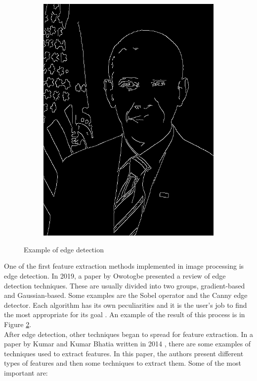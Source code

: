 \documentclass[conference]{IEEEtran}
\begin{document}
\begin{figure}[!ht]
\begin{subfigure}[!ht]{0.48\linewidth}
							\centerline{\includegraphics[width=0.9\linewidth]{imgs/obama_edges.jpg}}
							\label{fig:1a}
						\end{subfigure}
						\caption{Example of edge detection}
						\label{fig:1}
					\end{figure}
					
					One of the first feature extraction methods implemented in image processing is edge detection.				
					In 2019, a paper by Owotogbe presented a review of edge detection techniques. 
					These are usually divided into two groups, gradient-based and Gaussian-based. 
					Some examples are the Sobel operator and the Canny edge detector. 
					Each algorithm has its own peculiarities and it is the user's job to find 
					the most appropriate for its goal \cite{owotogbe2019edge}.
					An example of the result of this process is in Figure \ref{fig:1}.\\					
					
					\noindent After edge detection, other techniques began to spread for feature extraction. 
					In a paper by Kumar and Kumar Bhatia written in 2014 \cite{kumar2014detailed}, 
					there are some examples of techniques used to extract features. 
					In this paper, the authors present different types of features and then some techniques to extract them. 
					Some of the most important are:
\end{document}
